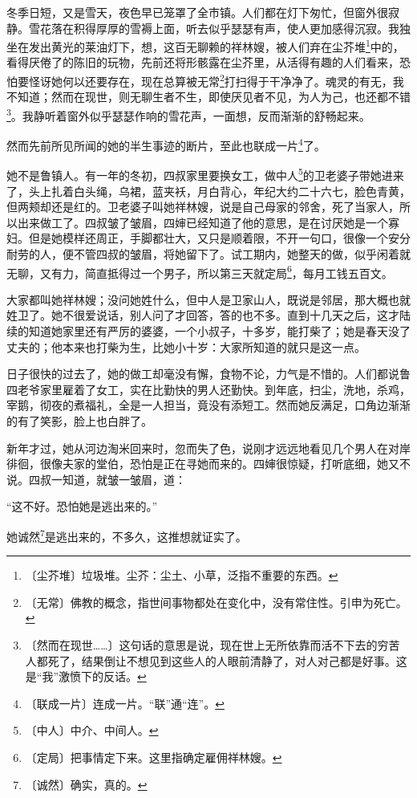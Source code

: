 \documentclass[12pt,UTF-8,openany]{ctexbook}
\begin{document}
\begin{large}
    冬季日短，又是雪天，夜色早已笼罩了全市镇。人们都在灯下匆忙，但窗外很寂静。雪花落在积得厚厚的雪褥上面，听去似乎瑟瑟有声，使人更加感得沉寂。我独坐在发出黄光的莱油灯下，想，这百无聊赖的祥林嫂，被人们弃在尘芥堆\footnote{〔尘芥堆〕垃圾堆。尘芥：尘土、小草，泛指不重要的东西。}中的，看得厌倦了的陈旧的玩物，先前还将形骸露在尘芥里，从活得有趣的人们看来，恐怕要怪讶她何以还要存在，现在总算被无常\footnote{〔无常〕佛教的概念，指世间事物都处在变化中，没有常住性。引申为死亡。}打扫得于干净净了。魂灵的有无，我不知道；然而在现世，则无聊生者不生，即使厌见者不见，为人为己，也还都不错\footnote{〔然而在现世……〕这句话的意思是说，现在世上无所依靠而活不下去的穷苦人都死了，结果倒让不想见到这些人的人眼前清静了，对人对己都是好事。这是“我”激愤下的反话。}。我静听着窗外似乎瑟瑟作响的雪花声，一面想，反而渐渐的舒畅起来。
    
    然而先前所见所闻的她的半生事迹的断片，至此也联成一片\footnote{〔联成一片〕连成一片。“联”通“连”。}了。
    
    她不是鲁镇人。有一年的冬初，四叔家里要换女工，做中人\footnote{〔中人〕中介、中间人。}的卫老婆子带她进来了，头上扎着白头绳，乌裙，蓝夹袄，月白背心，年纪大约二十六七，脸色青黄，但两颊却还是红的。卫老婆子叫她祥林嫂，说是自己母家的邻舍，死了当家人，所以出来做工了。四叔皱了皱眉，四婶已经知道了他的意思，是在讨厌她是一个寡妇。但是她模样还周正，手脚都壮大，又只是顺着限，不开一句口，很像一个安分耐劳的人，便不管四叔的皱眉，将她留下了。试工期内，她整天的做，似乎闲着就无聊，又有力，简直抵得过一个男子，所以第三天就定局\footnote{〔定局〕把事情定下来。这里指确定雇佣祥林嫂。}，每月工钱五百文。
    
    大家都叫她祥林嫂；没问她姓什么，但中人是卫家山人，既说是邻居，那大概也就姓卫了。她不很爱说话，别人问了才回答，答的也不多。直到十几天之后，这才陆续的知道她家里还有严厉的婆婆，一个小叔子，十多岁，能打柴了；她是春天没了丈夫的；他本来也打柴为生，比她小十岁：大家所知道的就只是这一点。
    
    日子很快的过去了，她的做工却毫没有懈，食物不论，力气是不惜的。人们都说鲁四老爷家里雇着了女工，实在比勤快的男人还勤快。到年底，扫尘，洗地，杀鸡，宰鹅，彻夜的煮福礼，全是一人担当，竟没有添短工。然而她反满足，口角边渐渐的有了笑影，脸上也白胖了。
    
    新年才过，她从河边淘米回来时，忽而失了色，说刚才远远地看见几个男人在对岸徘徊，很像夫家的堂伯，恐怕是正在寻她而来的。四婶很惊疑，打听底细，她又不说。四叔一知道，就皱一皱眉，道：
    
    “这不好。恐怕她是逃出来的。”
    
    她诚然\footnote{〔诚然〕确实，真的。}是逃出来的，不多久，这推想就证实了。
    

\end{large}
\end{document}
